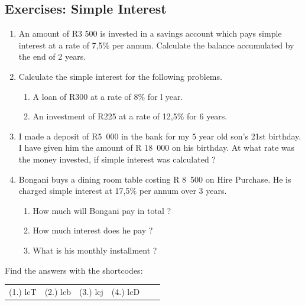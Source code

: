             \subsection{Exercises: Simple Interest }
            \nopagebreak
            \label{m39332*id71818}\begin{enumerate}[noitemsep, label=\textbf{\arabic*}. ] 
            \label{m39332*uid49}\item An amount of R3 500 is invested in a savings account which pays simple interest at a rate of 7,5\% per annum. Calculate the balance accumulated by the end of 2 years.\newline
\label{m39332*uid50}\item Calculate the simple interest for the following problems.
\label{m39332*id71847}\begin{enumerate}[noitemsep, label=\textbf{\alph*}. ] 
            \label{m39332*uid51}\item A loan of R300 at a rate of 8\% for l year.
\label{m39332*uid52}\item An investment of R225 at a rate of 12,5\% for 6 years.
\end{enumerate}
\label{m39332*uid53}\item I made a deposit of R5~000 in the bank for my 5 year old son's 21st birthday. I have given him the amount of R 18~000 on his birthday. At what rate was the money invested, if simple interest was calculated ?\newline
\label{m39332*uid54}\item Bongani buys a dining room table costing R 8~500 on Hire Purchase. He is charged simple interest at 17,5\% per annum over 3 years.
\label{m39332*id71906}\begin{enumerate}[noitemsep, label=\textbf{\alph*}. ] 
            \label{m39332*uid55}\item How much will Bongani pay in total ?
\label{m39332*uid56}\item How much interest does he pay ?
\label{m39332*uid57}\item What is his monthly installment ?
\end{enumerate}
\end{enumerate}
  \label{m39332**end}
\par {} Find the answers with the shortcodes:
 \par \begin{tabular}[h]{cccccc}
 (1.) lcT  &  (2.) lcb  &  (3.) lcj  &  (4.) lcD  & \end{tabular}
